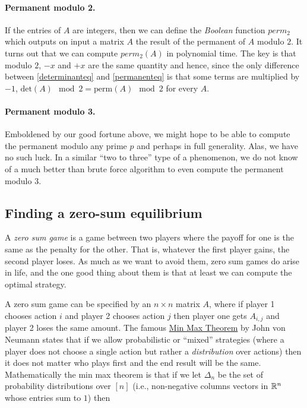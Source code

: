 \paragraph{Permanent modulo 2.} If the entries of \(A\) are integers,
then we can define the \emph{Boolean} function \(perm_2\) which outputs
on input a matrix \(A\) the result of the permanent of \(A\) modulo
\(2\). It turns out that we can compute \(perm_2(A)\) in polynomial
time. The key is that modulo \(2\), \(-x\) and \(+x\) are the same
quantity and hence, since the only difference between
\eqref{determinanteq} and \eqref{permanenteq} is that some terms are
multiplied by \(-1\),
\(\mathrm{det}(A) \mod 2 = \mathrm{perm}(A) \mod 2\) for every \(A\).

\paragraph{Permanent modulo 3.} Emboldened by our good fortune above, we
might hope to be able to compute the permanent modulo any prime \(p\)
and perhaps in full generality. Alas, we have no such luck. In a similar
``two to three'' type of a phenomenon, we do not know of a much better
than brute force algorithm to even compute the permanent modulo \(3\).

\subsection{Finding a zero-sum
equilibrium}\label{Finding-a-zero-sum-equili}

A \emph{zero sum game} is a game between two players where the payoff
for one is the same as the penalty for the other. That is, whatever the
first player gains, the second player loses. As much as we want to avoid
them, zero sum games do arise in life, and the one good thing about them
is that at least we can compute the optimal strategy.

A zero sum game can be specified by an \(n\times n\) matrix \(A\), where
if player 1 chooses action \(i\) and player 2 chooses action \(j\) then
player one gets \(A_{i,j}\) and player 2 loses the same amount. The
famous \href{https://en.wikipedia.org/wiki/Min-max_theorem}{Min Max
Theorem} by John von Neumann states that if we allow probabilistic or
``mixed'' strategies (where a player does not choose a single action but
rather a \emph{distribution} over actions) then it does not matter who
plays first and the end result will be the same. Mathematically the min
max theorem is that if we let \(\Delta_n\) be the set of probability
distributions over \([n]\) (i.e., non-negative columns vectors in
\({\mathbb{R}}^n\) whose entries sum to \(1\)) then

